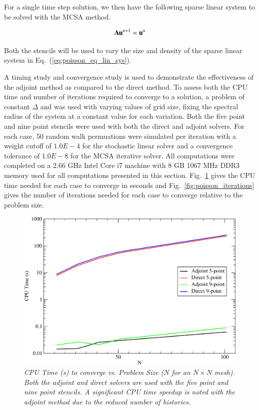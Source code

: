 \documentclass[preprint,12pt]{elsarticle}
\newcommand{\vA}{\ensuremath{\ve{A}}}
\newcommand{\vu}{\ensuremath{\ve{u}}}
\begin{document}
For a single time step solution, we then have the following sparse
linear system to be solved with the MCSA method.

\begin{equation}
  \vA \vu^{n+1} = \vu^n
  \label{eq:poisson_eq_lin_sys}
\end{equation}

Both the stencils will be used to vary the size and density of the
sparse linear system in Eq.~(\ref{eq:poisson_eq_lin_sys}).

A timing study and convergence study is used to demonstrate the
effectiveness of the adjoint method as compared to the direct
method. To assess both the CPU time and number of iterations required
to converge to a solution, a problem of constant $\Delta$ and was used
with varying values of grid size, fixing the spectral radius of the
system at a constant value for each variation. Both the five point and
nine point stencils were used with both the direct and adjoint
solvers. For each case, 50 random walk permuations were simulated per
iteration with a weight cutoff of $1.0E-4$ for the stochastic linear
solver and a convergence tolerance of $1.0E-8$ for the MCSA iterative
solver. All computations were completed on a 2.66 GHz Intel Core i7
machine with 8 GB 1067 MHz DDR3 memory used for all computations
presented in this section. Fig.~\ref{fig:poisson_cpu_time} gives the
CPU time needed for each case to converge in seconds and
Fig.~\ref{fig:poisson_iterations} gives the number of iterations
needed for each case to converge relative to the problem size.

\begin{figure}[htpb!]
  \centering
  \includegraphics[width=5in,clip]{Adjoint_Direct_CPU_Time.pdf}
  \caption{\sl CPU Time (s) to converge vs. Problem Size ($N$ for an
    $N \times N$ mesh). Both the adjoint and direct solvers are used
    with the five point and nine point stencils. A significant CPU
    time speedup is noted with the adjoint method due to the reduced
    number of histories.}
  \label{fig:poisson_cpu_time}
\end{figure}
\end{document}
